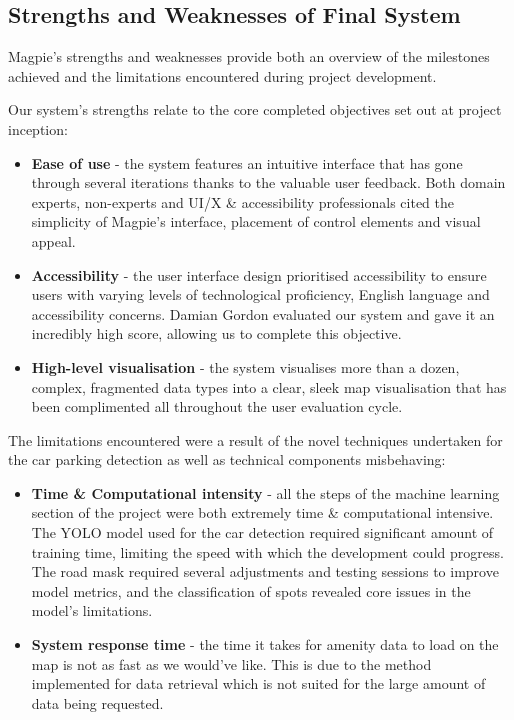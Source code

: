 \subsection{Strengths and Weaknesses of Final System}
Magpie's strengths and weaknesses provide both an overview of the milestones
achieved and the limitations encountered during project development.

Our system's strengths relate to the core completed objectives set out at
project inception:
\begin{itemize}
    \item \textbf{Ease of use} - the system features an intuitive interface that
          has gone through several iterations thanks to the valuable user feedback.
          Both domain experts, non-experts and UI/X \& accessibility professionals
          cited the simplicity of Magpie's interface, placement of control elements
          and visual appeal.
          
    \item \textbf{Accessibility} - the user interface design prioritised
          accessibility to ensure users with varying levels of technological
          proficiency, English language and accessibility concerns. Damian Gordon
          evaluated our system and gave it an incredibly high score, allowing us to
          complete this objective.
          
    \item \textbf{High-level visualisation} - the system visualises more than a
          dozen, complex, fragmented data types into a clear, sleek map visualisation
          that has been complimented all throughout the user evaluation cycle.
\end{itemize}

The limitations encountered were a result of the novel techniques undertaken for
the car parking detection as well as technical components misbehaving:
\begin{itemize}
    \item \textbf{Time \& Computational intensity} - all the steps of the
          machine learning section of the project were both extremely time \&
          computational intensive. The YOLO model used for the car detection required
          significant amount of training time, limiting the speed with which the
          development could progress. The road mask required several adjustments and
          testing sessions to improve model metrics, and the classification of spots
          revealed core issues in the model's limitations.
          
    \item \textbf{System response time} - the time it takes for amenity data to
          load on the map is not as fast as we would've like. This is due to the
          method implemented for data retrieval which is not suited for the large
          amount of data being requested.
\end{itemize}

